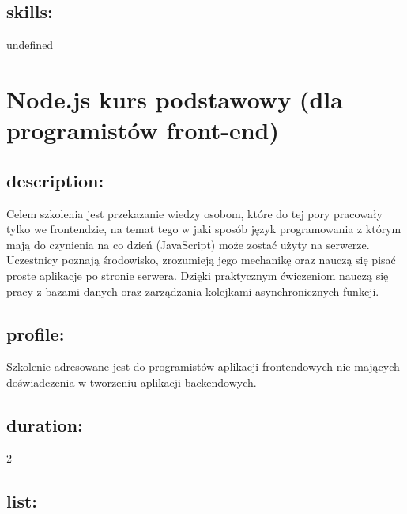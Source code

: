 \documentclass{article}[10pt]
\begin{document}
	\subsection*{skills:}
\begin{adjustwidth}{2cm}{}
	undefined
\end{adjustwidth}

\newpage


    
	\section{Node.js kurs podstawowy (dla programistów front-end)}

	\subsection*{description:}
	\begin{adjustwidth}{2cm}{}
		
Celem szkolenia jest przekazanie wiedzy osobom, które do tej pory pracowały tylko we frontendzie, na temat tego w jaki sposób język programowania z którym mają do czynienia na co dzień (JavaScript) może zostać użyty na serwerze. Uczestnicy poznają środowisko, zrozumieją jego mechanikę oraz nauczą się pisać proste aplikacje po stronie serwera. Dzięki praktycznym ćwiczeniom nauczą się pracy z bazami danych oraz zarządzania kolejkami asynchronicznych funkcji.


	\end{adjustwidth}
	\subsection*{profile:}
\begin{adjustwidth}{2cm}{}
	
Szkolenie adresowane jest do programistów aplikacji frontendowych nie mających doświadczenia w tworzeniu aplikacji backendowych.
\end{adjustwidth}
	\subsection*{duration:}
\begin{adjustwidth}{2cm}{}
	2
\end{adjustwidth}

	\subsection*{list:}
\begin{adjustwidth}{1.5cm}{}
	\begin{itemize}













	\end{itemize}
\end{adjustwidth}
\end{document}
